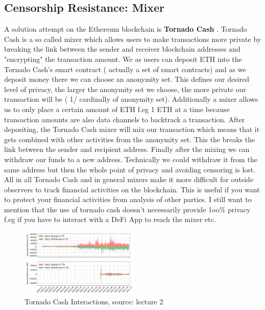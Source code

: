 \documentclass{article}
\begin{document}
\subsection{Censorship Resistance: Mixer}
A solution attempt on the Ethereum blockchain is \textbf{Tornado Cash} . Tornado Cash is a so called mixer which allows users to make transactions more private by breaking the link between the sender and receiver blockchain addresses and "encrypting" the transaction amount. We as users can deposit ETH into the Tornado Cash's smart contract ( actually a set of smart contracts) and as we deposit money there we can choose an anonymity set. This defines our desired level of privacy, the larger the anonymity set we choose, the more private our transaction will be ( 1/ cardinally of anonymity set). Additionally a mixer allows us to only place a certain amount of ETH f.eg 1 ETH  at a time because transaction amounts are also data channels to backtrack a transaction. After depositing, the Tornado Cash mixer will mix our transaction which means that it gets combined with other activities from the anonymity set. This the breaks the link between the sender and recipient address. Finally after the mixing we can withdraw our funds to a new address. Technically we could withdraw it from the same address but then the whole point of privacy and avoiding censoring is lost. All in all Tornado Cash and in general mixers make it more difficult for outside observers to track financial activities on the blockchain. This is useful if you want to  protect your financial activities from analysis of other parties. I still want to mention that the use of tornado  cash doesn't necessarily provide 1oo\% privacy f.eg if you have to interact with a DeFi App to reach the mixer etc.
\begin{figure}[h]
    \centering
    \includegraphics[width=0.5\textwidth]{tc.png} %
    \caption{Tornado Cash Interactions, \scriptsize{source: lecture 2}}
    \label{fig:image-example}
\end{figure}
\end{document}
